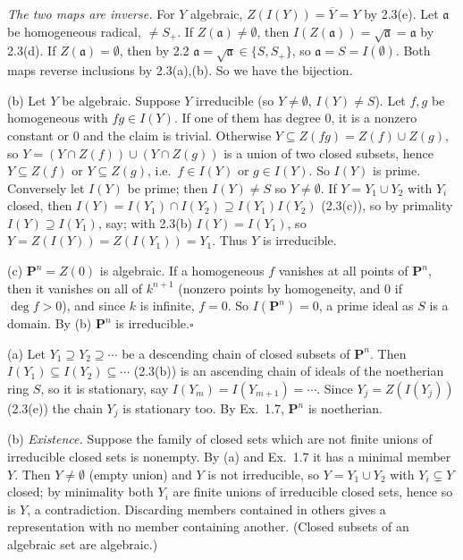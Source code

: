 \documentclass[11pt]{article}
\begin{document}
\emph{The two maps are inverse.} For $Y$ algebraic, $Z(I(Y))=\overline Y=Y$ by 2.3(e). Let $\mathfrak a$ be homogeneous radical, $\ne S_+$. If $Z(\mathfrak a)\ne\emptyset$, then $I(Z(\mathfrak a))=\sqrt{\mathfrak a}=\mathfrak a$ by 2.3(d). If $Z(\mathfrak a)=\emptyset$, then by 2.2 $\mathfrak a=\sqrt{\mathfrak a}\in\{S,S_+\}$, so $\mathfrak a=S=I(\emptyset)$. Both maps reverse inclusions by 2.3(a),(b). So we have the bijection.

(b) Let $Y$ be algebraic. Suppose $Y$ irreducible (so $Y\neq\emptyset$, $I(Y)\ne S$). Let $f,g$ be homogeneous with $fg\in I(Y)$. If one of them has degree $0$, it is a nonzero constant or $0$ and the claim is trivial. Otherwise $Y\subseteq Z(fg)=Z(f)\cup Z(g)$, so $Y=(Y\cap Z(f))\cup(Y\cap Z(g))$ is a union of two closed subsets, hence $Y\subseteq Z(f)$ or $Y\subseteq Z(g)$, i.e.\ $f\in I(Y)$ or $g\in I(Y)$. So $I(Y)$ is prime. Conversely let $I(Y)$ be prime; then $I(Y)\neq S$ so $Y\neq\emptyset$. If $Y=Y_1\cup Y_2$ with $Y_i$ closed, then $I(Y)=I(Y_1)\cap I(Y_2)\supseteq I(Y_1)I(Y_2)$ (2.3(c)), so by primality $I(Y)\supseteq I(Y_1)$, say; with 2.3(b) $I(Y)=I(Y_1)$, so $Y=Z(I(Y))=Z(I(Y_1))=Y_1$. Thus $Y$ is irreducible.

(c) $\mathbf P^n=Z(0)$ is algebraic. If a homogeneous $f$ vanishes at all points of $\mathbf P^n$, then it vanishes on all of $k^{n+1}$ (nonzero points by homogeneity, and $0$ if $\deg f>0$), and since $k$ is infinite, $f=0$. So $I(\mathbf P^n)=0$, a prime ideal as $S$ is a domain. By (b) $\mathbf P^n$ is irreducible.\hfill$\square$

\pf
(a) Let $Y_1\supseteq Y_2\supseteq\cdots$ be a descending chain of closed subsets of $\mathbf P^n$. Then $I(Y_1)\subseteq I(Y_2)\subseteq\cdots$ (2.3(b)) is an ascending chain of ideals of the noetherian ring $S$, so it is stationary, say $I(Y_m)=I(Y_{m+1})=\cdots$. Since $Y_j=Z(I(Y_j))$ (2.3(e)) the chain $Y_j$ is stationary too. By Ex.~1.7, $\mathbf P^n$ is noetherian.

(b) \emph{Existence.} Suppose the family of closed sets which are not finite unions of irreducible closed sets is nonempty. By (a) and Ex.~1.7 it has a minimal member $Y$. Then $Y\ne\emptyset$ (empty union) and $Y$ is not irreducible, so $Y=Y_1\cup Y_2$ with $Y_i\subsetneq Y$ closed; by minimality both $Y_i$ are finite unions of irreducible closed sets, hence so is $Y$, a contradiction. Discarding members contained in others gives a representation with no member containing another. (Closed subsets of an algebraic set are algebraic.)
\end{document}
